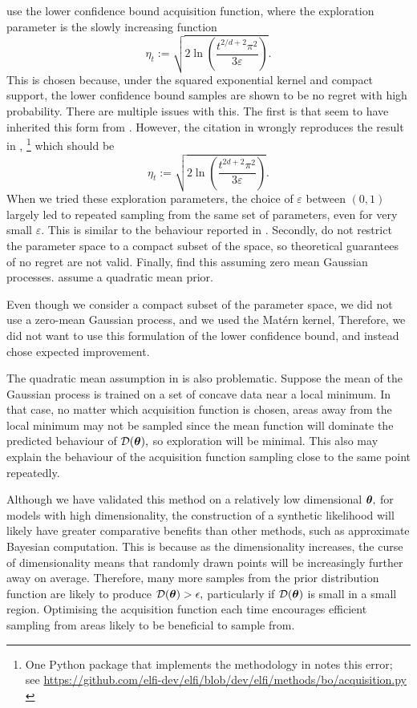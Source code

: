 \cite{gutmann_bayesian_2016} use the lower confidence bound acquisition
function, where the
exploration parameter is the slowly increasing function
$$\eta_t:= \sqrt{2\ln\left(\frac{t^{2/d + 2}\pi^2}{3\varepsilon}\right)}.$$
This is chosen because, under the squared exponential kernel and compact
support, the lower confidence bound samples are shown to be no regret with high
probability. There are multiple issues with this. The first is that
 seem to have inherited this form from
\cite{brochu_tutorial_2010}. However, the citation in
\cite{brochu_tutorial_2010} wrongly reproduces the result in
\cite{srinivas_gaussian_2010},
\footnote{
    One Python package that implements the methodology in
    \cite{gutmann_bayesian_2016} notes this error; see
    \url{
        https://github.com/elfi-dev/elfi/blob/dev/elfi/methods/bo/acquisition.py
    }
} which should be
$$\eta_t:= \sqrt{2\ln\left(\frac{t^{2d + 2}\pi^2}{3\varepsilon}\right)}.$$
When we tried these exploration parameters, the choice of
$\varepsilon$ between $(0, 1)$ largely led to repeated sampling from the same
set of parameters, even for very small $\varepsilon.$ This is similar to the
behaviour reported in \cite{gutmann_bayesian_2016}. Secondly,
 do not restrict the parameter space to
a compact subset of the space, so theoretical guarantees of no regret are
not valid. Finally,  find this assuming
zero mean Gaussian processes.  assume
a quadratic mean prior.

Even though we consider a compact subset of the parameter space,
we did not use a zero-mean Gaussian process, and we used the Mat\'ern kernel,
Therefore, we did not want to use this formulation of the lower confidence bound,
and instead chose expected improvement.

The quadratic mean assumption in \cite{gutmann_bayesian_2016} is also
problematic. Suppose the mean of the Gaussian process
is trained on a set of concave data near a local
minimum. In that case, 
no matter which acquisition function is chosen, areas away from the
local minimum may not be sampled since the mean function will dominate
the predicted behaviour of $\mathcal{D}(\bm{\theta}),$ so exploration will be minimal.
This also may explain the behaviour of the acquisition function sampling close
to the same point repeatedly.

Although we have validated this method on a relatively low dimensional
$\bm{\theta},$ for models with high dimensionality,
the construction
of a synthetic likelihood will likely have greater comparative benefits
than other methods, such as approximate Bayesian computation.
This is because as the dimensionality increases, the curse of dimensionality
means that randomly drawn points will be increasingly further away on average.
Therefore, many more samples from the prior distribution function are likely to
produce $\mathcal{D}(\bm{\theta}) > \epsilon,$ particularly if $\mathcal{D}(\bm{\theta})$ is small in
a small region. Optimising the acquisition function each time encourages
efficient sampling from areas likely to be beneficial to sample from.

